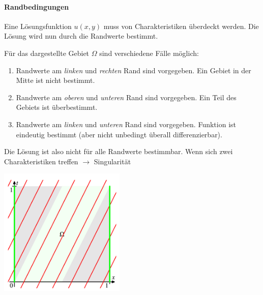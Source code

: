 \paragraph{Randbedingungen}
Eine Lösungsfunktion $u(x,y)$ muss von Charakteristiken überdeckt werden.
Die Lösung wird nun durch die Randwerte bestimmt.

\begin{minipage}{10cm}
    Für das dargestellte Gebiet $\Omega$ sind verschiedene Fälle möglich:
    \begin{enumerate}
        \item Randwerte am \emph{linken} und \emph{rechten} Rand sind vorgegeben.
        Ein Gebiet in der Mitte ist nicht bestimmt.
        \item Randwerte am \emph{oberen} und \emph{unteren} Rand sind vorgegeben.
        Ein Teil des Gebiets ist überbestimmt.
        \item Randwerte am \emph{linken} und \emph{unteren} Rand sind vorgegeben.
        Funktion ist eindeutig bestimmt (aber nicht unbedingt überall differenzierbar).
    \end{enumerate}
    Die Lösung ist also nicht für alle Randwerte bestimmbar. \newline
    Wenn sich zwei Charakteristiken treffen $\rightarrow$ Singularität
\end{minipage}
\hspace{0.5cm}
\begin{minipage}{8cm}
    \centering
    \includegraphics[width=6cm]{Content/Theory/charakteristiken_randwerte.png}
\end{minipage}

